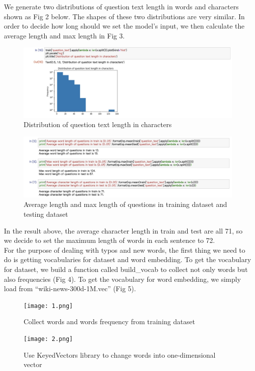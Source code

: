 \documentclass{article}
\begin{document}
\noindent We generate two distributions of question text length in words and characters shown as Fig 2 below. The shapes of these two distributions are very similar. In order to decide how long should we set the model’s input, we then calculate the average length and max length in Fig 3.\\
\begin{figure}[H] %
\hspace*{0pt}
	\centering
	\includegraphics[scale = 0.2]{n3.jpeg}
	\caption{ Distribution of question text length in characters}
\hspace*{0pt}
\end{figure}
\begin{figure}[H]
	\centering
	\includegraphics[scale = 0.2]{n2.jpeg} %
	\caption{Average length and max length of questions in training dataset and testing dataset}
\end{figure}
\noindent In the result above, the average character length in train and test are all 71, so we decide to set the maximum length of words in each sentence to 72.\\

\noindent For the purpose of dealing with typos and new words, the first thing we need to do is getting vocabularies for dataset and word embedding. To get the vocabulary for dataset, we build a function called build\_vocab to collect not only words but also frequencies (Fig 4). To get the vocabulary for word embedding, we simply load from “wiki-news-300d-1M.vec” (Fig 5).\\
\begin{figure}[H]
	\centering
	\texttt{[image: 1.png]} %
	\caption{Collect words and words frequency from training dataset }
\end{figure}
\begin{figure}[H]
	\centering
	\texttt{[image: 2.png]} %
	\caption{Use KeyedVectors library to change words into one-dimensional vector}
\end{figure}
\end{document}
